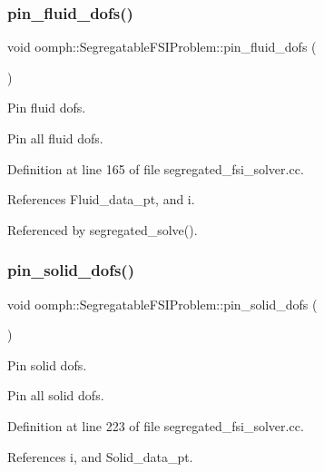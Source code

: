 \subsubsection{\texorpdfstring{pin\+\_\+fluid\+\_\+dofs()}{pin\_fluid\_dofs()}}
{\footnotesize\ttfamily void oomph\+::\+Segregatable\+F\+S\+I\+Problem\+::pin\+\_\+fluid\+\_\+dofs (\begin{DoxyParamCaption}{ }\end{DoxyParamCaption})\hspace{0.3cm}{\ttfamily [private]}}



Pin fluid dofs. 

Pin all fluid dofs. 

Definition at line 165 of file segregated\+\_\+fsi\+\_\+solver.\+cc.



References Fluid\+\_\+data\+\_\+pt, and i.



Referenced by segregated\+\_\+solve().

\mbox{\label{classoomph_1_1SegregatableFSIProblem_acf28573efb54e2b33101ba8cb503a5b8}} 
\subsubsection{\texorpdfstring{pin\+\_\+solid\+\_\+dofs()}{pin\_solid\_dofs()}}
{\footnotesize\ttfamily void oomph\+::\+Segregatable\+F\+S\+I\+Problem\+::pin\+\_\+solid\+\_\+dofs (\begin{DoxyParamCaption}{ }\end{DoxyParamCaption})\hspace{0.3cm}{\ttfamily [protected]}}



Pin solid dofs. 

Pin all solid dofs. 

Definition at line 223 of file segregated\+\_\+fsi\+\_\+solver.\+cc.



References i, and Solid\+\_\+data\+\_\+pt.



